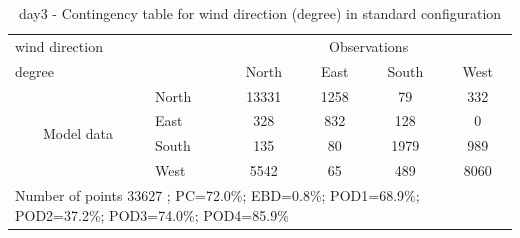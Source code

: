 \begin{table}[p!]
\begin{center}
\begin{tabular}{llcccc}
\hline
{wind direction}                                       &                             &    \multicolumn{4}{c}{Observations}                 \\
{degree}                                       &                             & {North}   & {East} & {South} & {West} \\
\hline
\multicolumn{1}{c}{\multirow{4}{*}{Model data}}  & {North}                    & 13331   & 1258    & 79     & 332\\
                                                 & {East}                     & 328   & 832    & 128     & 0\\
                                                 & {South}                    & 135   & 80   & 1979    & 989\\
                                                 & {West}                     & 5542  & 65   & 489    & 8060\\
\hline 
\multicolumn{6}{l}{ Number of points        33627 ; PC=72.0\%; EBD=0.8\%; POD1=68.9\%; POD2=37.2\%; POD3=74.0\%; POD4=85.9\%}                 \\
\end{tabular}
\end{center}
\caption{day3 - Contingency table for {wind direction} (degree) in standard configuration}
\label{tab:contingencywdBEF:day3}
\end{table}
